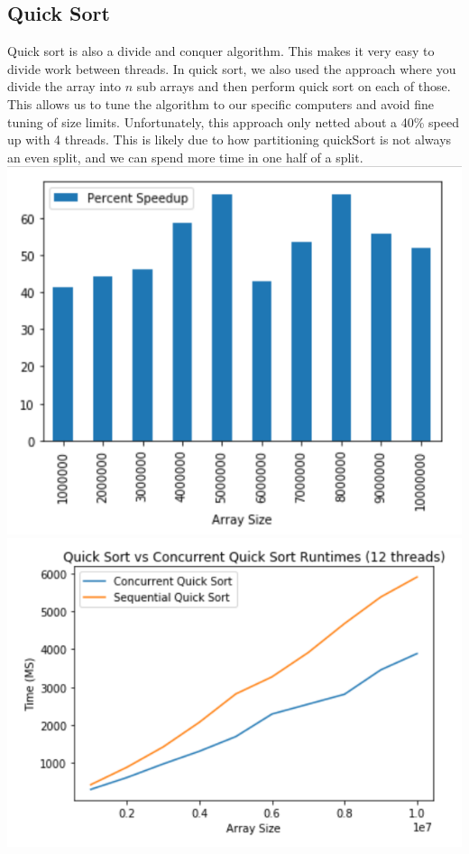 \documentclass{article}
\begin{document}
\subsection{Quick Sort}
Quick sort is also a divide and conquer algorithm. This makes it very easy to divide work between threads. In quick sort, we also used the approach where you divide the array into $n$ sub arrays and then perform quick sort on each of those. This allows us to tune the algorithm to our specific computers and avoid fine tuning of size limits. Unfortunately, this approach only netted about a 40\% speed up with 4 threads. This is likely due to how partitioning quickSort is not always an even split, and we can spend more time in one half of a split.
\newline
\includegraphics{figures/quickbar.PNG}\newline
\includegraphics{figures/quickline.PNG}
\end{document}

